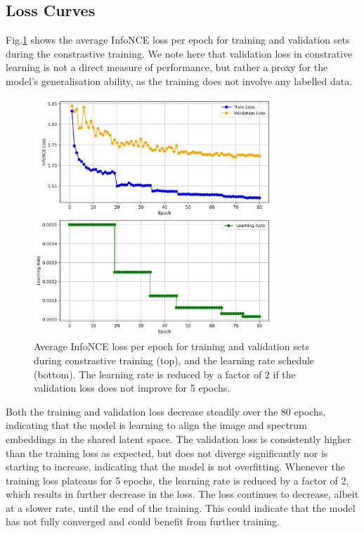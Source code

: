 \documentclass[a4paper,12pt]{article}
\begin{document}
\subsection{Loss Curves}
Fig.\ref{fig:loss} shows the average InfoNCE loss per epoch for training and validation sets during the constrastive training. We note here that validation loss in constrative learning is not a direct measure of performance, but rather a proxy for the model's generalisation ability, as the training does not involve any labelled data.
\begin{figure}[H]
    \centering
    \includegraphics[width=0.8\textwidth]{../figures/training_plot.png}
    \caption{Average InfoNCE loss per epoch for training and validation sets during constrastive training (top), and the learning rate schedule (bottom). The learning rate is reduced by a factor of 2 if the validation loss does not improve for 5 epochs.}
    \label{fig:loss}
\end{figure}

Both the training and validation loss decrease steadily over the 80 epochs, indicating that the model is learning to align the image and spectrum embeddings in the shared latent space. The validation loss is consistently higher than the training loss as expected, but does not diverge significantly nor is starting to increase, indicating that the model is not overfitting. Whenever the training loss plateaus for 5 epochs, the learning rate is reduced by a factor of 2, which results in further decrease in the loss. The loss continues to decrease, albeit at a slower rate, until the end of the training. This could indicate that the model has not fully converged and could benefit from further training. 
\end{document}
